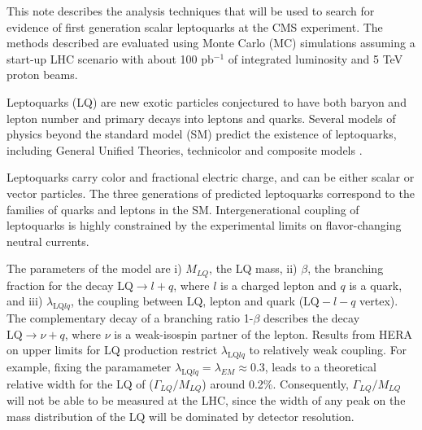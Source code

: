This note describes the analysis techniques that will be used to search for evidence of first generation scalar leptoquarks 
at the CMS experiment. The methods described are evaluated using Monte Carlo (MC) simulations assuming a start-up LHC scenario
with about 100 pb$^{-1}$ of integrated luminosity and 5 TeV proton beams.

Leptoquarks (LQ) are new exotic particles conjectured to have both baryon and lepton number and primary decays into leptons and quarks.    
Several models of physics beyond the standard model (SM) predict the existence of leptoquarks, including General Unified Theories, 
technicolor and composite models \cite{theories}.  

Leptoquarks carry color and fractional electric 
charge, and can be either scalar or vector particles. The three generations of predicted leptoquarks 
correspond to the families of quarks and leptons in the SM.  Intergenerational coupling of leptoquarks is 
highly constrained by the experimental limits on flavor-changing neutral currents. %

The parameters of the model are i) $M_{LQ}$, the LQ mass, ii) $\beta$, the branching fraction for the decay 
$\mbox{LQ} \rightarrow l + q$, where $l$ is a charged lepton and $q$ is a quark, and
iii) $\lambda_{\mbox{LQ}lq}$, the coupling between LQ, lepton and quark ($\mbox{LQ}-l-q$ vertex). 
The complementary decay of a branching ratio 1-$\beta$ describes the decay $\mbox{LQ} \rightarrow \nu + q$, 
where $\nu$ is a weak-isospin partner of the lepton.
Results from HERA on upper limits for LQ production restrict  
$\lambda_{\mbox{LQ}lq}$ to relatively weak coupling\cite{hera}. For example, fixing the paramameter 
$\lambda_{\mbox{LQ}lq} = \lambda_{EM} \approx 0.3$, leads to 
a theoretical relative width for the LQ of ($\Gamma_{LQ}/M_{LQ}$) around 0.2\%. 
Consequently, $\Gamma_{LQ}/M_{LQ}$ will not be able to be measured at the LHC, since 
the width of any peak on the mass distribution of the LQ will be dominated by detector resolution.  

